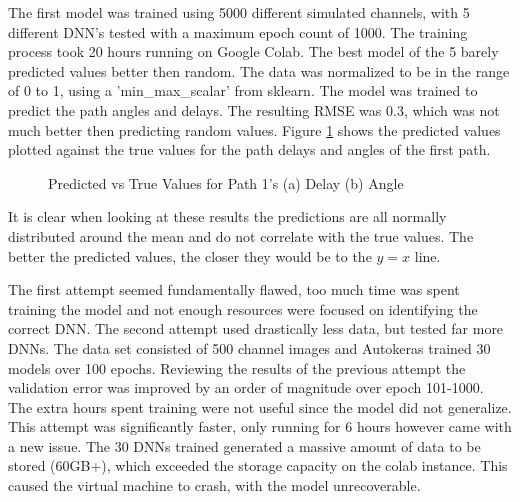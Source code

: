 The first model was trained using 5000 different simulated channels, with 5 different DNN's tested with a maximum epoch count of 1000. The training process took 20 hours running on Google Colab. The best model of the 5 barely predicted values better then random. The data was normalized to be in the range of 0 to 1, using a 'min\_max\_scalar' from sklearn. The model was trained to predict the path angles and delays. The resulting RMSE was 0.3, which was not much better then predicting random values. Figure \ref{fig:dnnres} shows the predicted values plotted against the true values for the path delays and angles of the first path.
\begin{figure}[H]
    \caption{Predicted vs True Values for Path 1's (a) Delay (b) Angle}
    \label{fig:dnnres}
\end{figure}
\noindent
It is clear when looking at these results the predictions are all normally distributed around the mean and do not correlate with the true values. The better the predicted values, the closer they would be to the \(y=x\) line.

The first attempt seemed fundamentally flawed, too much time was spent training the model and not enough resources were focused on identifying the correct DNN. The second attempt used drastically less data, but tested far more DNNs. The data set consisted of 500 channel images and Autokeras trained 30 models over 100 epochs. Reviewing the results of the previous attempt the validation error was improved by an order of magnitude over epoch 101-1000. The extra hours spent training were not useful since the model did not generalize. This attempt was significantly faster, only running for 6 hours however came with a new issue. The 30 DNNs trained generated a massive amount of data to be stored (60GB+), which exceeded the storage capacity on the colab instance. This caused the virtual machine to crash, with the model unrecoverable. 

